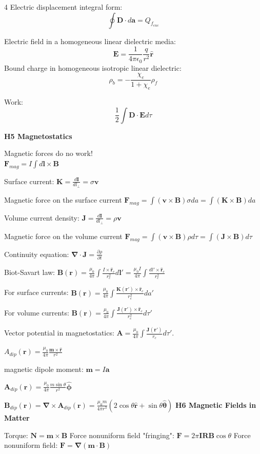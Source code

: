 \documentclass[a4paper,twoside]{article}
\newcommand{\secblock}[1]{\vspace{0.08ex}\textbf{#1}\par}
\begin{document}
\begin{multicols*}{4}
Electric displacement integral form:
\[
\oint \bm D \cdot d\bm a = Q_{f_{enc}}
\]

Electric field in a homogeneous linear dielectric media:
\[
\bm E = \frac{1}{4\pi \epsilon _0} \frac{q}{r^2}\hat{\bm r}
\]
Bound charge in homogeneous isotropic linear dielectric:
\[
\rho _b = - \frac{\chi_e}{1+\chi_e} \rho_f
\]

Work:
\[
\frac{1}{2} \int \bm D \cdot \bm E d\tau
\]







\secblock{H5 Magnetostatics}
Magnetic forces do no work!\\
\(
\bm F_{mag} = I \int d \bm l \times \bm B
\)

Surface current:
\(
\bm K = \frac{d \bm I}{dl_\perp} = \sigma \bm v
\)

Magnetic force on the surface current
\(
\bm F_{mag} =  \int ( \bm v \times \bm B)\sigma da =  \int ( \bm K \times \bm B)da
\)

Volume current density:
\(
\bm J = \frac{d \bm I}{dl_\perp} = \rho \bm v
\)

Magnetic force on the volume current
\(
\bm F_{mag} =  \int ( \bm v \times \bm B)\rho d\tau =  \int ( \bm J \times \bm B)d\tau
\)

Continuity equation:
\(
\bm \nabla \cdot \bm J = \frac{\partial \rho}{\partial t}
\)

Biot-Savart law:
\(
\bm{B}(\bm{r})=\frac{\mu_0}{4\pi}\int\frac{I\times\hat{\bm{r}}_c}{r_c^2}d\bm l'
=\frac{\mu_0 I}{4\pi}\int\frac{dl'\times\hat{\bm{r}}_c}{r^2_c}
\)

For surface currents:
\(\bm{B}(\bm{r})=\frac{\mu_0}{4\pi}\int\frac{\bm K(\bm r')\times\hat{\bm{r}}_c}{r_c^2}d a'\)

For volume currents:
\(\bm{B}(\bm{r})=\frac{\mu_0}{4\pi}\int\frac{\bm J(\bm r')\times\hat{\bm{r}}_c}{r_c^2}d \tau '\)

Vector potential in magnetostatics:
\(\bm A = \frac{\mu_0}{4\pi}\int\frac{\bm J(\bm r')}{r_c}d \tau '\).

\(A_{dip}(\bm r) = \frac{\mu_0}{4\pi}\frac{\bm m \times \hat{\bm r}}{r^2}\)

magnetic dipole moment:
\(\bm m = I \bm a\)

\(\bm A_{dip} (\bm r) = \frac{\mu_0}{4\pi} \frac{m \sin \theta}{r^2}\hat{\bm \phi}\)

\(\bm B_{dip} (\bm r) = \bm \nabla \times \bm A_{dip} (\bm r) = \frac{\mu_0 m}{4\pi r^3}(2\cos \theta \hat{\bm r} + \sin \theta \hat{\bm \theta})\)
\secblock{H6 Magnetic Fields in Matter}
Torque:
\(\bm N = \bm m \times \bm B\)
Force nonuniform field "fringing":
\(\bm F = 2\pi \bm I \bm R \bm B \cos\theta\)
Force nonuniform field: 
\(\bm F = \bm \nabla (\bm m \cdot \bm B)\)


\end{multicols*}
\end{document}
